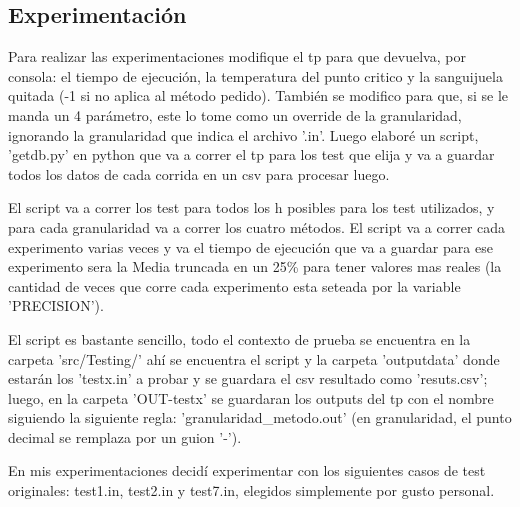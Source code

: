 \documentclass[a4paper]{article}
\begin{document}
\subsection{Experimentación}
Para realizar las experimentaciones modifique el tp para que devuelva, por consola: el tiempo de ejecución, la temperatura del punto critico y la sanguijuela quitada (-1 si no aplica al método pedido). También se modifico para que, si se le manda un 4 parámetro, este lo tome como un override de la granularidad, ignorando la granularidad que indica el archivo '.in'.
Luego elaboré un script, 'getdb.py' en python que va a correr el tp para los test que elija y va a guardar todos los datos de cada corrida en un csv para procesar luego.

El script va a correr los test para todos los h posibles para los test utilizados, y para cada granularidad va a correr los cuatro métodos. El script va a correr cada experimento varias veces y va el tiempo de ejecución que va a guardar para ese experimento sera la Media truncada en un 25\% para tener valores mas reales (la cantidad de veces que corre cada experimento esta seteada por la variable 'PRECISION').

El script es bastante sencillo, todo el contexto de prueba se encuentra en la carpeta 'src/Testing/' ahí se encuentra el script y la carpeta 'outputdata' donde estarán los 'testx.in' a probar y se guardara el csv resultado como 'resuts.csv'; luego, en la carpeta 'OUT-testx' se guardaran los outputs del tp con el nombre siguiendo la siguiente regla: 'granularidad_metodo.out' (en granularidad, el punto decimal se remplaza por un guion '-'). \par
\smallbreak
En mis experimentaciones decidí experimentar con los siguientes casos de test originales: test1.in, test2.in y test7.in, elegidos simplemente por gusto personal. 
\end{document}
